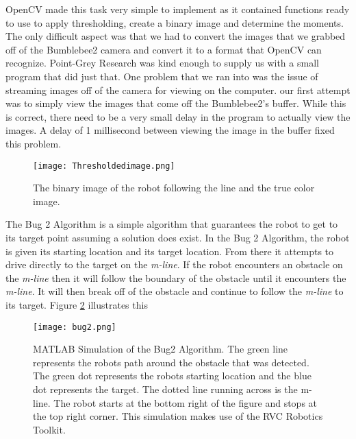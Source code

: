 \documentclass[12pt]{article}
\begin{document}
OpenCV made this task very simple to implement as it contained functions ready to use to apply thresholding, create a binary image and determine the moments. The only difficult aspect was that we had to convert the images that we grabbed off of the Bumblebee2 camera and convert it to a format that OpenCV can recognize. Point-Grey Research was kind enough to supply us with a small program that did just that. One problem that we ran into was the issue of streaming images off of the camera for viewing on the computer. our first attempt was to simply view the images that come off the Bumblebee2's buffer. While this is correct, there need to be a very small delay in the program to actually view the images. A delay of 1 millisecond between viewing the image in the buffer fixed this problem.

\begin{figure}[htp!]
	\begin{center}
		\texttt{[image: Thresholdedimage.png]}
		\caption{The binary image of the robot following the line and the true color image.} \label{fig.color}
	\end{center}
\end{figure}

The Bug 2 Algorithm is a simple algorithm that guarantees the robot to get to its target point assuming a solution does exist. In the Bug 2 Algorithm, the robot is given its starting location and its target location. From there it attempts to drive directly to the target on the \textit{m-line}. If the robot encounters an obstacle on the \textit{m-line} then it will follow the boundary of the obstacle until it encounters the \textit{m-line}. It will then break off of the obstacle and continue to follow the \textit{m-line} to its target. Figure \ref{fig.bug2} illustrates this 

\begin{figure}[htp!]
	\begin{center}
		\texttt{[image: bug2.png]}
		\caption{MATLAB Simulation of the Bug2 Algorithm. The green line represents the robots path around the obstacle that was detected. The green dot represents the robots starting location and the blue dot represents the target. The dotted line running across is the m-line. The robot starts at the bottom right of the figure and stops at the top right corner. This simulation makes use of the RVC Robotics Toolkit.} \label{fig.bug2}
	\end{center}
\end{figure}
\end{document}
